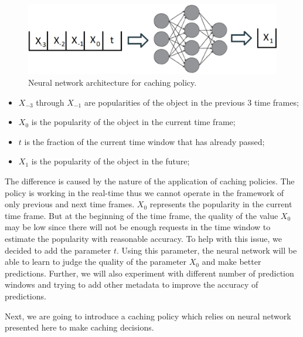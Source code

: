 \begin{figure}[h!]
	\centering
	\includegraphics[width=\linewidth]{pics/cache1.png}
	\caption{Neural network architecture for caching policy.}
	\label{fig:cache1}
\end{figure}

\begin{itemize}
	\item $X_{-3}$ through $X_{-1}$ are popularities of the object in the previous 3 time frames;
	\item $X_0$ is the popularity of the object in the current time frame;
	\item $t$ is the fraction of the current time window that has already passed;
	\item $X_1$ is the popularity of the object in the future;
\end{itemize}

The difference is caused by the nature of the application of caching policies. The policy is working in the real-time thus we cannot operate in the framework of only previous and next time frames. $X_0$ represents the popularity in the current time frame. But at the beginning of the time frame, the quality of the value $X_0$ may be low since there will not be enough requests in the time window to estimate the popularity with reasonable accuracy. To help with this issue, we decided to add the parameter $t$. Using this parameter, the neural network will be able to learn to judge the quality of the parameter $X_0$ and make better predictions. Further, we will also experiment with different number of prediction windows and trying to add other metadata to improve the accuracy of predictions.

Next, we are going to introduce a caching policy which relies on neural network presented here to make caching decisions.

